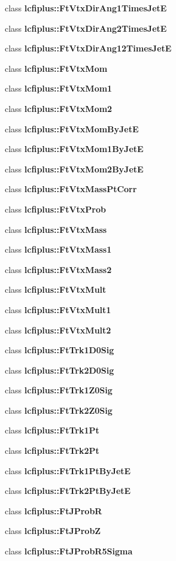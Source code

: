 \begin{DoxyCompactItemize}
\item 
class {\bf lcfiplus\-::\-Ft\-Vtx\-Dir\-Ang1\-Times\-Jet\-E}
\item 
class {\bf lcfiplus\-::\-Ft\-Vtx\-Dir\-Ang2\-Times\-Jet\-E}
\item 
class {\bf lcfiplus\-::\-Ft\-Vtx\-Dir\-Ang12\-Times\-Jet\-E}
\item 
class {\bf lcfiplus\-::\-Ft\-Vtx\-Mom}
\item 
class {\bf lcfiplus\-::\-Ft\-Vtx\-Mom1}
\item 
class {\bf lcfiplus\-::\-Ft\-Vtx\-Mom2}
\item 
class {\bf lcfiplus\-::\-Ft\-Vtx\-Mom\-By\-Jet\-E}
\item 
class {\bf lcfiplus\-::\-Ft\-Vtx\-Mom1\-By\-Jet\-E}
\item 
class {\bf lcfiplus\-::\-Ft\-Vtx\-Mom2\-By\-Jet\-E}
\item 
class {\bf lcfiplus\-::\-Ft\-Vtx\-Mass\-Pt\-Corr}
\item 
class {\bf lcfiplus\-::\-Ft\-Vtx\-Prob}
\item 
class {\bf lcfiplus\-::\-Ft\-Vtx\-Mass}
\item 
class {\bf lcfiplus\-::\-Ft\-Vtx\-Mass1}
\item 
class {\bf lcfiplus\-::\-Ft\-Vtx\-Mass2}
\item 
class {\bf lcfiplus\-::\-Ft\-Vtx\-Mult}
\item 
class {\bf lcfiplus\-::\-Ft\-Vtx\-Mult1}
\item 
class {\bf lcfiplus\-::\-Ft\-Vtx\-Mult2}
\item 
class {\bf lcfiplus\-::\-Ft\-Trk1\-D0\-Sig}
\item 
class {\bf lcfiplus\-::\-Ft\-Trk2\-D0\-Sig}
\item 
class {\bf lcfiplus\-::\-Ft\-Trk1\-Z0\-Sig}
\item 
class {\bf lcfiplus\-::\-Ft\-Trk2\-Z0\-Sig}
\item 
class {\bf lcfiplus\-::\-Ft\-Trk1\-Pt}
\item 
class {\bf lcfiplus\-::\-Ft\-Trk2\-Pt}
\item 
class {\bf lcfiplus\-::\-Ft\-Trk1\-Pt\-By\-Jet\-E}
\item 
class {\bf lcfiplus\-::\-Ft\-Trk2\-Pt\-By\-Jet\-E}
\item 
class {\bf lcfiplus\-::\-Ft\-J\-Prob\-R}
\item 
class {\bf lcfiplus\-::\-Ft\-J\-Prob\-Z}
\item 
class {\bf lcfiplus\-::\-Ft\-J\-Prob\-R5\-Sigma}
\item 

\end{DoxyCompactItemize}

